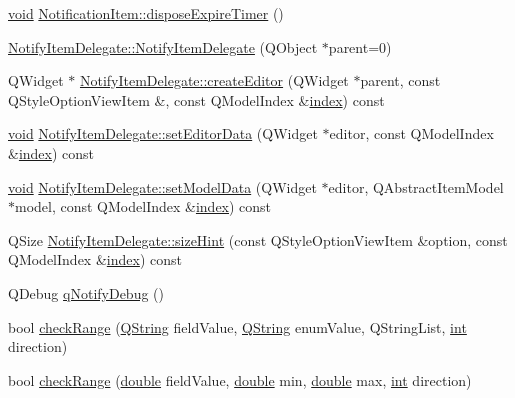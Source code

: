 \begin{DoxyCompactItemize}
\item 
\hyperlink{group___u_a_v_objects_plugin_ga444cf2ff3f0ecbe028adce838d373f5c}{void} \hyperlink{group__notifyplugin_ga701d292a397a1198e167f249475b77e0}{Notification\-Item\-::dispose\-Expire\-Timer} ()
\item 
\hyperlink{group__notifyplugin_ga356769d008d39fd8dfdf8377c20ea450}{Notify\-Item\-Delegate\-::\-Notify\-Item\-Delegate} (Q\-Object $\ast$parent=0)
\item 
Q\-Widget $\ast$ \hyperlink{group__notifyplugin_ga5b91b80661023d558e683e9b0fadca50}{Notify\-Item\-Delegate\-::create\-Editor} (Q\-Widget $\ast$parent, const Q\-Style\-Option\-View\-Item \&, const Q\-Model\-Index \&\hyperlink{glext_8h_ab47dd9958bcadea08866b42bf358e95e}{index}) const 
\item 
\hyperlink{group___u_a_v_objects_plugin_ga444cf2ff3f0ecbe028adce838d373f5c}{void} \hyperlink{group__notifyplugin_ga75249b15c513ab2ea9691a7e2307ef19}{Notify\-Item\-Delegate\-::set\-Editor\-Data} (Q\-Widget $\ast$editor, const Q\-Model\-Index \&\hyperlink{glext_8h_ab47dd9958bcadea08866b42bf358e95e}{index}) const 
\item 
\hyperlink{group___u_a_v_objects_plugin_ga444cf2ff3f0ecbe028adce838d373f5c}{void} \hyperlink{group__notifyplugin_gacd6ffc2f5989d0a64c398e6604d72e8e}{Notify\-Item\-Delegate\-::set\-Model\-Data} (Q\-Widget $\ast$editor, Q\-Abstract\-Item\-Model $\ast$model, const Q\-Model\-Index \&\hyperlink{glext_8h_ab47dd9958bcadea08866b42bf358e95e}{index}) const 
\item 
Q\-Size \hyperlink{group__notifyplugin_ga5529e9472e4132a0066755c88969323b}{Notify\-Item\-Delegate\-::size\-Hint} (const Q\-Style\-Option\-View\-Item \&option, const Q\-Model\-Index \&\hyperlink{glext_8h_ab47dd9958bcadea08866b42bf358e95e}{index}) const 
\item 
Q\-Debug \hyperlink{group__notifyplugin_gaa12b557f54e20bfddabd963a0eccbaac}{q\-Notify\-Debug} ()
\item 
bool \hyperlink{group__notifyplugin_ga0173f54afe75735a4e4e7cdca2842f4c}{check\-Range} (\hyperlink{group___u_a_v_objects_plugin_gab9d252f49c333c94a72f97ce3105a32d}{Q\-String} field\-Value, \hyperlink{group___u_a_v_objects_plugin_gab9d252f49c333c94a72f97ce3105a32d}{Q\-String} enum\-Value, Q\-String\-List, \hyperlink{ioapi_8h_a787fa3cf048117ba7123753c1e74fcd6}{int} direction)
\item 
bool \hyperlink{group__notifyplugin_ga217a28e0d56a684ecdd678af52024bae}{check\-Range} (\hyperlink{_super_l_u_support_8h_a8956b2b9f49bf918deed98379d159ca7}{double} field\-Value, \hyperlink{_super_l_u_support_8h_a8956b2b9f49bf918deed98379d159ca7}{double} min, \hyperlink{_super_l_u_support_8h_a8956b2b9f49bf918deed98379d159ca7}{double} max, \hyperlink{ioapi_8h_a787fa3cf048117ba7123753c1e74fcd6}{int} direction)

\end{DoxyCompactItemize}
